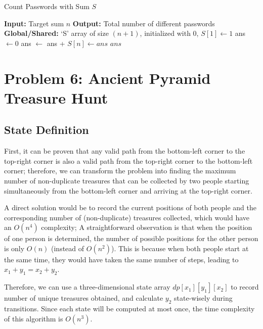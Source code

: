 \documentclass[11pt, a4paper, oneside]{memoir}
\begin{document}
\begin{algorithm}[H]
    \caption{Count Passwords with Sum $S$}
    \label{alg:count_passwords}
    \begin{algorithmic}[1]
        \State \textbf{Input:} Target sum $n$
        \State \textbf{Output:} Total number of different passwords
        \State \textbf{Global/Shared:} `S' array of size $(n+1)$, initialized with $0$, $S[1] \gets 1$
                \State {} 
            \EndIf
                \State {} 
            \EndIf
            \State ans $\gets 0$
                \State ans $\gets$ ans + 
            \EndFor
            \State $S[n] \gets ans$ 
            \State \Return $ans$
        \EndFunction
    \end{algorithmic}
\end{algorithm}

\chapter{Problem 6: Ancient Pyramid Treasure Hunt}
\section{State Definition}
First, it can be proven that any valid path from the bottom-left corner to the top-right corner
is also a valid path from the top-right corner to the bottom-left corner;
therefore, we can transform the problem into finding the maximum number of non-duplicate treasures
that can be collected by two people starting simultaneously from the bottom-left corner and arriving at the top-right corner.

A direct solution would be to record the current positions of both people and the corresponding number of (non-duplicate) treasures collected,
which would have an $O(n^4)$ complexity; A straightforward observation is that when the position of one person is determined,
the number of possible positions for the other person is only $O(n)$ (instead of $O(n^2)$).
This is because when both people start at the same time, they would have taken the same number of steps, leading to $x_1+y_1=x_2+y_2$.

Therefore, we can use a three-dimensional state array $dp[x_1][y_1][x_2]$ to record number of unique treasures obtained, and calculate $y_2$ state-wisely during transitions.
Since each state will be computed at most once, the time complexity of this algorithm is $O(n^3)$.
\end{document}
